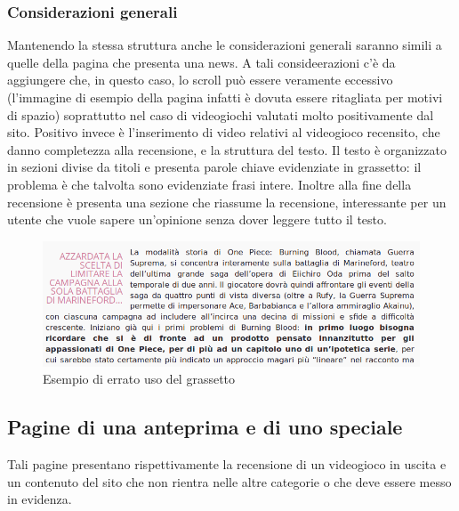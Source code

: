 \documentclass[../ProgettoTecWeb2.tex]{subfiles}
\begin{document}
		\subsubsection{Considerazioni generali}
		Mantenendo la stessa struttura anche le considerazioni generali saranno simili a quelle della pagina che presenta una news. A tali consideerazioni c'è da aggiungere che, in questo caso, lo scroll può essere veramente eccessivo (l'immagine di esempio della pagina infatti è dovuta essere ritagliata per motivi di spazio) soprattutto nel caso di videogiochi valutati molto positivamente dal sito. Positivo invece è l'inserimento di video relativi al videogioco recensito, che danno completezza alla recensione, e la struttura del testo. Il testo è organizzato in sezioni divise da titoli e presenta parole chiave evidenziate in grassetto: il problema è che talvolta sono evidenziate frasi intere. Inoltre alla fine della recensione è presenta una sezione che riassume la recensione, interessante per un utente che vuole sapere un'opinione senza dover leggere tutto il testo.
		\begin{figure} [H]
			\centering
			\includegraphics[scale=0.4]{img/ErratoUsoGrassetto}
			\caption{Esempio di errato uso del grassetto}
		\end{figure}

	\subsection{Pagine di una anteprima e di uno speciale}
	Tali pagine presentano rispettivamente la recensione di un videogioco in uscita e un contenuto del sito che non rientra nelle altre categorie o che deve essere messo in evidenza.
\end{document}
